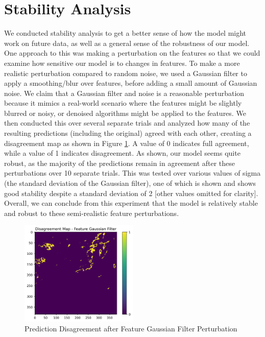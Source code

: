 \documentclass[10pt,letterpaper]{article}
\begin{document}
\section{Stability Analysis}
We conducted stability analysis to get a better sense of how the model might work on future data, as well as a general sense of the robustness of our model. One approach to this was making a perturbation on the features so that we could examine how sensitive our model is to changes in features. To make a more realistic perturbation compared to random noise, we used a Gaussian filter to apply a smoothing/blur over features, before adding a small amount of Gaussian noise. We claim that a Gaussian filter and noise is a reasonable perturbation because it mimics a real-world scenario where the features might be slightly blurred or noisy, or denoised algorithms might be applied to the features. We then conducted this over several separate trials and analyzed how many of the resulting predictions (including the original) agreed with each other, creating a disagreement map as shown in Figure \ref{fig:feature_gaussian_filter_disagreement}. A value of 0 indicates full agreement, while a value of 1 indicates disagreement. As shown, our model seems quite robust, as the majority of the predictions remain in agreement after these perturbations over 10 separate trials. This was tested over various values of sigma (the standard deviation of the Gaussian filter), one of which is shown and shows good stability despite a standard deviation of 2 [other values omitted for clarity]. Overall, we can conclude from this experiment that the model is relatively stable and robust to these semi-realistic feature perturbations.

\begin{figure}[ht]
    \centering
    \includegraphics[width=0.5\textwidth]{figs/feature_gaussian_filter_disagreement_map.png}
    \caption{Prediction Disagreement after Feature Gaussian Filter Perturbation}
    \label{fig:feature_gaussian_filter_disagreement}
\end{figure}
\end{document}

